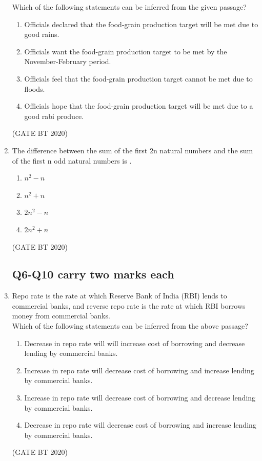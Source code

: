 \documentclass[journal,12pt,onecolumn]{IEEEtran}
\theoremstyle{remark}
\begin{document}
\begin{enumerate}[label=Q\arabic*:]
Which of the following statements can be inferred from the given passage?
\begin{multicols}{2}
\begin{enumerate}

\item Officials declared that the food-grain production target will be met due to good rains.
\item Officials want the food-grain production target to be met by the November-February period.
\item Officials feel that the food-grain production target cannot be met due to floods.
\item Officials hope that the food-grain production target will be met due to a good rabi produce.

\end{enumerate}
\end{multicols}
\hfill(GATE BT 2020)

\item The difference between the sum of the first 2n natural numbers and the sum of the first n odd natural numbers is .
\begin{multicols}{4}
\begin{enumerate}
\item $n^2 - n$
\item $n^2 + n$
\item $2n^2 - n$
\item $2n^2 + n$
\end{enumerate}
\end{multicols}
\hfill(GATE BT 2020)

\subsection*{Q6-Q10 carry two marks each}

\item Repo rate is the rate at which Reserve Bank of India (RBI) lends to commercial banks, and reverse repo rate is the rate at which RBI borrows money from commercial banks.\\

Which of the following statements can be inferred from the above passage?
\begin{multicols}{2}
\begin{enumerate}
\item Decrease in repo rate will will increase cost of borrowing and decrease lending by commercial banks.
\item Increase in repo rate will decrease cost of borrowing and increase lending by commercial banks.
\item Increase in repo rate will decrease cost of borrowing and decrease lending by commercial banks.
\item Decrease in repo rate will decrease cost of borrowing and increase lending by commercial banks.
\end{enumerate}
\end{multicols}\hfill(GATE BT 2020)


\end{enumerate}
\end{document}
